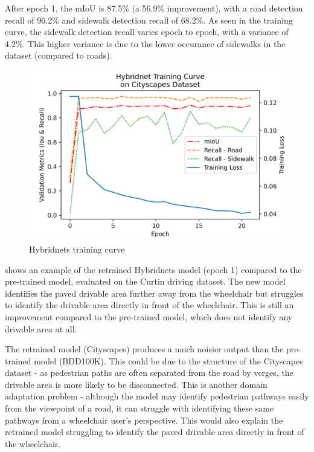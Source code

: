 After epoch 1, the mIoU is 87.5\% (a 56.9\% improvement), with a
road detection recall of 96.2\% and sidewalk detection recall of
68.2\%. As seen in the training curve, the sidewalk detection recall
varies epoch to epoch, with a variance of 4.2\%. This higher variance is
due to the lower occurance of sidewalks in the dataset (compared to roads).

\begin{figure}[b]
    \centering
    \includegraphics[width=0.8\linewidth]{images/hybridnet_training_curve.png}
    \caption{Hybridnets training curve}
    \label{fig:hybridnet_training_curve}
\end{figure}

 shows an example of the retrained Hybridnets model
(epoch 1) compared to the pre-trained model, evaluated on the Curtin driving dataset.
The new model identifies the paved drivable area further away from
the wheelchair but struggles to identify the drivable area directly in front of the wheelchair.
This is still an improvement compared to the pre-trained model, which does not identify any drivable
area at all.

The retrained model (Cityscapes) produces a much noisier output than the pre-trained model (BDD100K).
This could be due to the structure of the Cityscapes dataset - as pedestrian paths are often
separated from the road by verges, the drivable area is more likely to be disconnected.
This is another domain adaptation problem - although the model may identify pedestrian
pathways easily from the viewpoint of a road, it can struggle with identifying these
same pathways from a wheelchair user's perspective. This would also explain the
retrained model struggling to identify the paved drivable area directly in front of the wheelchair.


